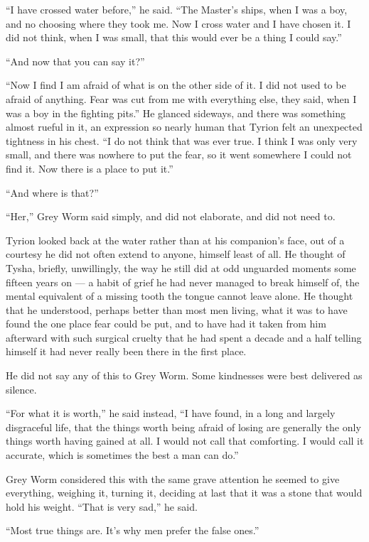 “I have crossed water before,” he said. “The Master’s ships, when I was a boy, and no choosing where they took me. Now I cross water and I have chosen it. I did not think, when I was small, that this would ever be a thing I could say.”

“And now that you can say it?”

“Now I find I am afraid of what is on the other side of it. I did not used to be afraid of anything. Fear was cut from me with everything else, they said, when I was a boy in the fighting pits.” He glanced sideways, and there was something almost rueful in it, an expression so nearly human that Tyrion felt an unexpected tightness in his chest. “I do not think that was ever true. I think I was only very small, and there was nowhere to put the fear, so it went somewhere I could not find it. Now there is a place to put it.”

“And where is that?”

“Her,” Grey Worm said simply, and did not elaborate, and did not need to.

Tyrion looked back at the water rather than at his companion’s face, out of a courtesy he did not often extend to anyone, himself least of all. He thought of Tysha, briefly, unwillingly, the way he still did at odd unguarded moments some fifteen years on — a habit of grief he had never managed to break himself of, the mental equivalent of a missing tooth the tongue cannot leave alone. He thought that he understood, perhaps better than most men living, what it was to have found the one place fear could be put, and to have had it taken from him afterward with such surgical cruelty that he had spent a decade and a half telling himself it had never really been there in the first place.

He did not say any of this to Grey Worm. Some kindnesses were best delivered as silence.

“For what it is worth,” he said instead, “I have found, in a long and largely disgraceful life, that the things worth being afraid of losing are generally the only things worth having gained at all. I would not call that comforting. I would call it accurate, which is sometimes the best a man can do.”

Grey Worm considered this with the same grave attention he seemed to give everything, weighing it, turning it, deciding at last that it was a stone that would hold his weight. “That is very sad,” he said.

“Most true things are. It’s why men prefer the false ones.”

